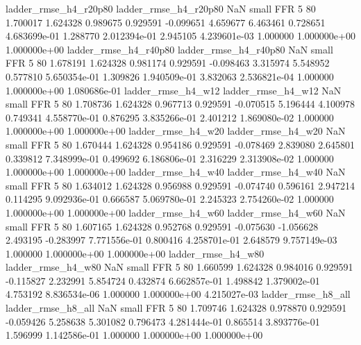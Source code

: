    ladder_rmse_h4_r20p80    ladder_rmse_h4_r20p80                   NaN      small      FFR                 5 80 1.700017       1.624328 0.989675       0.929591   -0.099651      4.659677      6.463461     0.728651   4.683699e-01  1.288770 2.012394e-01     2.945105   4.239601e-03            1.000000    1.000000e+00        1.000000e+00
   ladder_rmse_h4_r40p80    ladder_rmse_h4_r40p80                   NaN      small      FFR                 5 80 1.678191       1.624328 0.981174       0.929591   -0.098463      3.315974      5.548952     0.577810   5.650354e-01  1.309826 1.940509e-01     3.832063   2.536821e-04            1.000000    1.000000e+00        1.080686e-01
      ladder_rmse_h4_w12       ladder_rmse_h4_w12                   NaN      small      FFR                 5 80 1.708736       1.624328 0.967713       0.929591   -0.070515      5.196444      4.100978     0.749341   4.558770e-01  0.876295 3.835266e-01     2.401212   1.869080e-02            1.000000    1.000000e+00        1.000000e+00
      ladder_rmse_h4_w20       ladder_rmse_h4_w20                   NaN      small      FFR                 5 80 1.670444       1.624328 0.954186       0.929591   -0.078469      2.839080      2.645801     0.339812   7.348999e-01  0.499692 6.186806e-01     2.316229   2.313908e-02            1.000000    1.000000e+00        1.000000e+00
      ladder_rmse_h4_w40       ladder_rmse_h4_w40                   NaN      small      FFR                 5 80 1.634012       1.624328 0.956988       0.929591   -0.074740      0.596161      2.947214     0.114295   9.092936e-01  0.666587 5.069780e-01     2.245323   2.754260e-02            1.000000    1.000000e+00        1.000000e+00
      ladder_rmse_h4_w60       ladder_rmse_h4_w60                   NaN      small      FFR                 5 80 1.607165       1.624328 0.952768       0.929591   -0.075630     -1.056628      2.493195    -0.283997   7.771556e-01  0.800416 4.258701e-01     2.648579   9.757149e-03            1.000000    1.000000e+00        1.000000e+00
      ladder_rmse_h4_w80       ladder_rmse_h4_w80                   NaN      small      FFR                 5 80 1.660599       1.624328 0.984016       0.929591   -0.115827      2.232991      5.854724     0.432874   6.662857e-01  1.498842 1.379002e-01     4.753192   8.836534e-06            1.000000    1.000000e+00        4.215027e-03
      ladder_rmse_h8_all       ladder_rmse_h8_all                   NaN      small      FFR                 5 80 1.709746       1.624328 0.978870       0.929591   -0.059426      5.258638      5.301082     0.796473   4.281444e-01  0.865514 3.893776e-01     1.596999   1.142586e-01            1.000000    1.000000e+00        1.000000e+00

